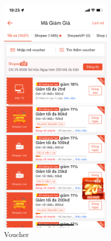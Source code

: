 \begin{figure}[H]
    \centering
    \begin{subfigure}[b]{0.4\textwidth}
        \centering
        \includegraphics[width=0.6\textwidth]{Voucher.PNG}
        \caption{Voucher}
    \end{subfigure}
    \hfill
    \begin{subfigure}[b]{0.4\textwidth}
        \centering

\end{subfigure}
\end{figure}
